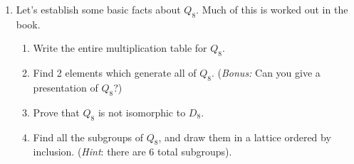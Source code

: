 \documentclass[11pt]{article}
\newtheorem{definition}[theorem]{Definition}
\newcommand{\la}{\langle}
\newcommand{\ra}{\rangle}
\begin{document}
\begin{enumerate}
\begin{enumerate}
    \item Show that there is an element $x\in G$ of order 2.  (Once we have Cauchy's theorem for nonabelian groups this part becomes easy, but since $G$ has 6 elements, one can do this by inspection using Lagrange's theorem).
    \item Let $x\in G$ have order 2, and let $H = \la x\ra$.  Show that $H$ is not normal in $G$.  (\textit{Hint:} Show that if $H$ is normal then $H\le Z(G)$, then  apply 3(c) to find a contradiction.)
    \item Define an action of $G$ on the set $A = G/H$ by \textit{left multiplication}: that is $g\cdot(xH) = gxH$.  Show that this defines a well defined group action.
    \item Consider the action of $G$ on $A = G/H$ by left multiplication.  Show that the associated permutation representation is injective.  Conclude that $G\cong S_3$.
    \end{enumerate}
As we start defining more exotic properties of groups we will need to expand our library of finite groups to exhibit some of these interesting properties.  We finish with two new examples of finite groups.  First up: Quaternions.
\begin{definition}
  The \textit{quaternion group of order 8}, denoted $Q_8$ is the group of the following 8 elements:
  \[Q_8 = \{\pm1,\pm i, \pm j, \pm k\}\]
  subject to the relations:
  \[(-1)^2 = 1\]
  \[i^2 = j^2 = k^2 = -1,\]
  \[(-1)x = -x = x(-1)\text{ for all }x,\]
  \begin{eqnarray*}
    ij = k, & \hspace{20pt} & ji = -k,\\
    jk = i, & \hspace{20pt} & kj = -i,\\
    ki = j, & \hspace{20pt} & ik = -j.
  \end{eqnarray*}
\end{definition}
  \item Let's establish some basic facts about $Q_8$. Much of this is worked out in the book.
  \begin{enumerate}
    \item Write the entire multiplication table for $Q_8$.
    \item Find 2 elements which generate all of $Q_8$.  (\textit{Bonus:} Can you give a presentation of $Q_8$?)
    \item Prove that $Q_8$ is not isomorphic to $D_8$.
    \item Find all the subgroups of $Q_8$, and draw them in a lattice ordered by inclusion.  (\textit{Hint}: there are 6 total subgroups).

\end{enumerate}
\end{enumerate}
\end{document}
